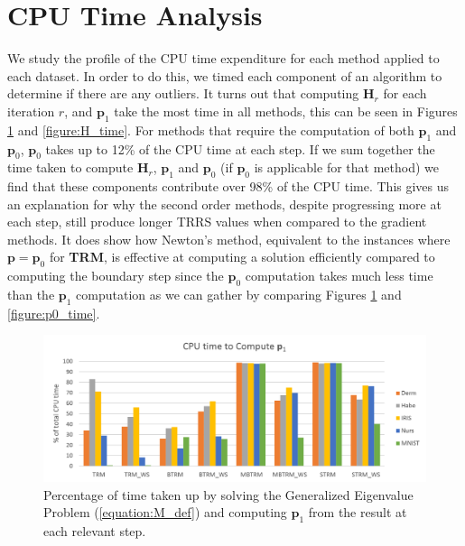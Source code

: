 \documentclass[letterpaper,12pt,titlepage,oneside,final]{book}
\begin{document}
	
	
	\section{CPU Time Analysis}
	We study the profile of the CPU time expenditure for each method applied to each dataset. In order to do this, we timed each component of an algorithm to determine if there are any outliers. It turns out that computing $\mathbf{H}_{r}$ for each iteration $r$, and $\mathbf{p}_{1}$ take the most time in all methods, this can be seen in Figures \ref{figure:p1_time} and \ref{figure:H_time}. For methods that require the computation of both $\mathbf{p}_{1}$ and $\mathbf{p}_{0}$, $\mathbf{p}_{0}$ takes up to 12\% of the CPU time at each step. If we sum together the time taken to compute $\mathbf{H}_{r}$, $\mathbf{p}_{1}$ and $\mathbf{p}_{0}$ (if $\mathbf{p}_{0}$ is applicable for that method) we find that these components contribute over 98\% of the CPU time. This gives us an explanation for why the second order methods, despite progressing more at each step, still produce longer TRRS values when compared to the gradient methods. It does show how Newton's method, equivalent to the instances where $\mathbf{p} = \mathbf{p}_{0}$ for \textbf{TRM}, is effective at computing a solution efficiently compared to computing the boundary step since the $\mathbf{p}_{0}$ computation takes much less time than the $\mathbf{p}_{1}$ computation as we can gather by comparing Figures \ref{figure:p1_time} and \ref{figure:p0_time}.
	\begin{figure}
		\centering
		\includegraphics[width=\textwidth]{images/CPU_time_p1}
		\caption{Percentage of time taken up by solving the Generalized Eigenvalue Problem (\ref{equation:M_def}) and computing $\mathbf{p}_{1}$ from the result at each relevant step.}
		\label{figure:p1_time}
	\end{figure}
\end{document}
